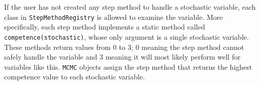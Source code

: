 If the user has not created any step method to handle a stochastic variable, each class in \texttt{StepMethodRegistry} is allowed to examine the variable. More specifically, each step method implements a static method called \texttt{competence(stochastic)}, whose only argument is a single stochastic variable. These methods return values from 0 to 3; 0 meaning the step method cannot safely handle the variable and 3 meaning it will most likely perform well for variables like this. \texttt{MCMC} objects assign the step method that returns the highest competence value to each stochastic variable.